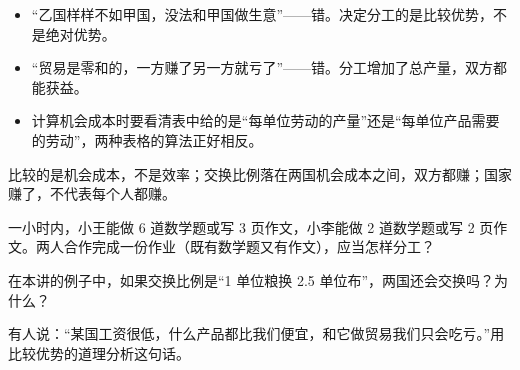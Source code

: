 \begin{pitfall}
\begin{itemize}
  \item “乙国样样不如甲国，没法和甲国做生意”——错。决定分工的是比较优势，不是绝对优势。
  \item “贸易是零和的，一方赚了另一方就亏了”——错。分工增加了总产量，双方都能获益。
  \item 计算机会成本时要看清表中给的是“每单位劳动的产量”还是“每单位产品需要的劳动”，两种表格的算法正好相反。
\end{itemize}
\end{pitfall}

\begin{oneline}
比较的是机会成本，不是效率；交换比例落在两国机会成本之间，双方都赚；国家赚了，不代表每个人都赚。
\end{oneline}

\begin{exercises}[练一练]
  \item 一小时内，小王能做 6 道数学题或写 3 页作文，小李能做 2 道数学题或写 2 页作文。两人合作完成一份作业（既有数学题又有作文），应当怎样分工？
  \item 在本讲的例子中，如果交换比例是“1 单位粮换 2.5 单位布”，两国还会交换吗？为什么？
  \item 有人说：“某国工资很低，什么产品都比我们便宜，和它做贸易我们只会吃亏。”用比较优势的道理分析这句话。
\end{exercises}
